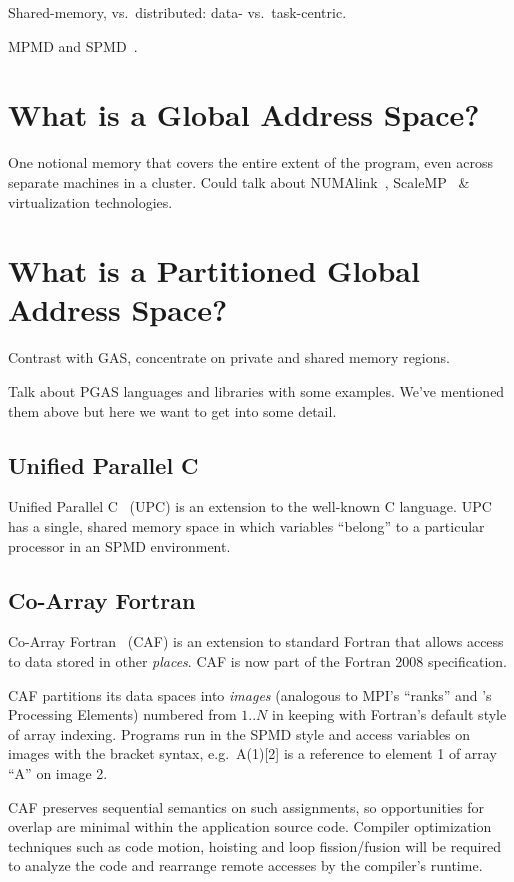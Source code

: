 Shared-memory, vs.\ distributed: data- vs.\ task-centric.

MPMD and SPMD~\cite{SPMD}.

\section{What is a Global Address Space?}

One notional memory that covers the entire extent of the program, even
across separate machines in a cluster.  Could talk about NUMAlink~\cite{NUMAlink},
ScaleMP~\cite{scalemp} \& virtualization technologies.

\section{What is a Partitioned Global Address Space?}

Contrast with GAS, concentrate on private and shared memory regions.

Talk about PGAS languages and libraries with some examples.  We've mentioned
them above but here we want to get into some detail.

\subsection{Unified Parallel C}

Unified Parallel C~\cite{upc} (UPC) is an extension to the well-known
C language.  UPC has a single, shared memory space in which variables
``belong'' to a particular processor in an SPMD environment.

\subsection{Co-Array Fortran}

Co-Array Fortran~\cite{coarray} (CAF) is an extension to standard
Fortran that allows access to data stored in other \emph{places}.  CAF
is now part of the Fortran 2008 specification.

CAF partitions its data spaces into \emph{images} (analogous to MPI's
``ranks'' and \openshmem{}'s Processing Elements) numbered from $1..N$ in
keeping with Fortran's default style of array indexing.
Programs run in the SPMD style and access variables on images with
the bracket syntax, e.g.\ A(1)[2] is a reference to element 1 of array
``A'' on image 2.

CAF preserves sequential semantics on such assignments, so
opportunities for overlap are minimal within the application source
code.  Compiler optimization techniques such as code motion, hoisting
and loop fission/fusion will be required to analyze the code and
rearrange remote accesses by the compiler's runtime.

